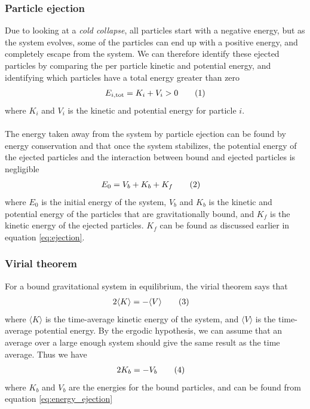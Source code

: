 \documentclass{article}
\newcommand\numberthis{\addtocounter{equation}{1}\tag{\theequation}}
\begin{document}
\subsubsection{Particle ejection}
Due to looking at a \textit{cold collapse}, all particles start with a negative energy, but as the system evolves, some of the particles can end up with a positive energy, and completely escape from the system. We can therefore identify these ejected particles by comparing the per particle kinetic and potential energy, and identifying which particles have a total energy greater than zero
\begin{align*}
  E_{i,\text{tot}} = K_i + V_i > 0 \numberthis\label{eq:ejection}
\end{align*}
where $K_i$ and $V_i$ is the kinetic and potential energy for particle $i$.\\\\
The energy taken away from the system by particle ejection can be found by energy conservation and that once the system stabilizes, the potential energy of the ejected particles and the interaction between bound and ejected particles is negligible
\begin{align*}
  E_0 &= V_b + K_b + K_f \numberthis\label{eq:energy_ejection}
\end{align*}
where $E_0$ is the initial energy of the system, $V_b$ and $K_b$ is the kinetic and potential energy of the particles that are gravitationally bound, and $K_f$ is the kinetic energy of the ejected particles.
$K_f$ can be found as discussed earlier in equation \eqref{eq:ejection}.

\subsubsection{Virial theorem}
For a bound gravitational system in equilibrium, the virial theorem says that
\begin{align*}
  2\langle K\rangle &= -\langle V\rangle \numberthis\label{eq:virial}
\end{align*}
where $\langle K\rangle$ is the time-average kinetic energy of the system, and $\langle V\rangle$ is the time-average potential energy. By the ergodic hypothesis, we can assume that an average over a large enough system should give the same result as the time average. Thus we have
\begin{align*}
  2K_b &= -V_b \numberthis\label{eq:virial2}
\end{align*}
where $K_b$ and $V_b$ are the energies for the bound particles, and can be found from equation \eqref{eq:energy_ejection}
\end{document}
